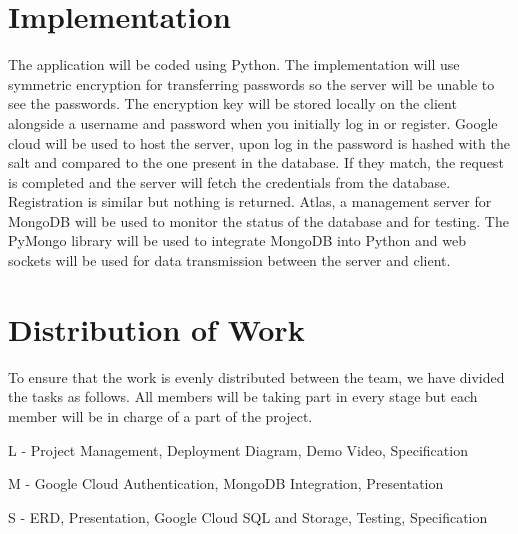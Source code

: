 \documentclass[11pt]{article}
\begin{document}
\section{Implementation}
The application will be coded using Python. The implementation will use symmetric encryption for transferring passwords so the server will be unable to see the passwords. The encryption key will be stored locally on the client alongside a username and password when you initially log in or register. Google cloud will be used to host the server, upon log in the password is hashed with the salt and compared to the one present in the database. If they match, the request is completed and the server will fetch the credentials from the database. Registration is similar but nothing is returned. Atlas, a management server for MongoDB will be used to monitor the status of the database and for testing. The PyMongo library will be used to integrate MongoDB into Python and web sockets will be used for data transmission between the server and client.
\section{Distribution of Work}
To ensure that the work is evenly distributed between the team, we have divided the tasks as follows. All members will be taking part in every stage but each member will be in charge of a part of the project.
\par
L - Project Management, Deployment Diagram, Demo Video, Specification
\par
M - Google Cloud Authentication, MongoDB Integration, Presentation
\par
S - ERD, Presentation, Google Cloud SQL and Storage, Testing, Specification
\printbibliography[heading=bibintoc]
\end{document}
